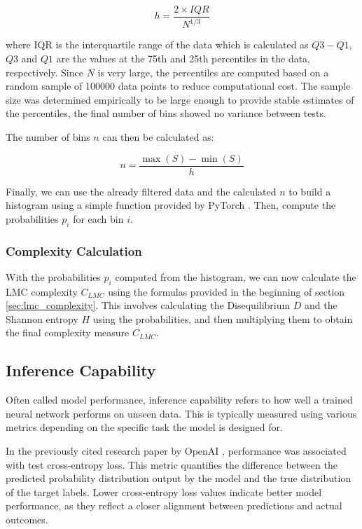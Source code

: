         \[ h = \frac{2 \times IQR}{N^{1/3}} \]

        where IQR is the interquartile range of the data which is calculated as \( Q3 - Q1 \), \( Q3 \) and \( Q1 \) are the values at the 75th and 25th percentiles in the data, respectively. Since \( N \) is very large, the percentiles are computed based on a random sample of 100000 data points to reduce computational cost. The sample size was determined empirically to be large enough to provide stable estimates of the percentiles, the final number of bins showed no variance between tests.

        The number of bins \( n \) can then be calculated as:

        \[ n = \frac{\max(S) - \min(S)}{h} \]

        Finally, we can use the already filtered data and the calculated \( n \) to build a histogram using a simple function provided by PyTorch \cite{Paszke2019}. Then, compute the probabilities \( p_i \) for each bin \( i \).

    \subsubsection{Complexity Calculation}

        With the probabilities \( p_i \) computed from the histogram, we can now calculate the LMC complexity \( C_{LMC} \) using the formulas provided in the beginning of section \ref{sec:lmc_complexity}. This involves calculating the Disequilibrium \( D \) and the Shannon entropy \( H \) using the probabilities, and then multiplying them to obtain the final complexity measure \( C_{LMC} \).

\subsection{Inference Capability}

    Often called model performance, inference capability refers to how well a trained neural network performs on unseen data. This is typically measured using various metrics depending on the specific task the model is designed for. 
    
    In the previously cited research paper by OpenAI \cite{Kaplan2020}, performance was associated with test cross-entropy loss. This metric quantifies the difference between the predicted probability distribution output by the model and the true distribution of the target labels. Lower cross-entropy loss values indicate better model performance, as they reflect a closer alignment between predictions and actual outcomes.


